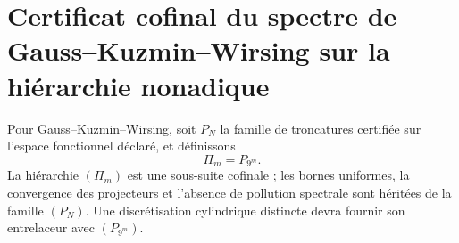 \section{Certificat cofinal du spectre de Gauss--Kuzmin--Wirsing sur la hiérarchie nonadique}
\label{sec:p3-final:cierre-gkw}

Pour Gauss--Kuzmin--Wirsing, soit \(P_N\) la famille de troncatures
certifiée sur l’espace fonctionnel déclaré, et définissons
\[
 \Pi_m=P_{9^m}.
\]
La hiérarchie \((\Pi_m)\) est une sous-suite cofinale ; les bornes uniformes, la
convergence des projecteurs et l’absence de pollution spectrale sont
héritées de la famille \((P_N)\). Une discrétisation cylindrique distincte devra
fournir son entrelaceur avec \((P_{9^m})\).
